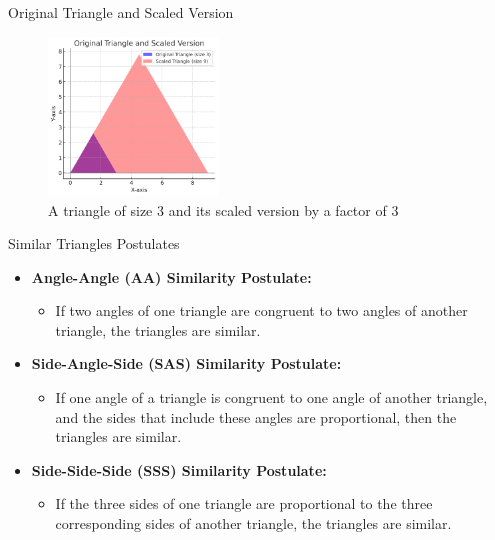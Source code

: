 \documentclass{beamer}
\begin{document}
\begin{frame}{Original Triangle and Scaled Version}
    \begin{figure}
        \centering
        \includegraphics[width=0.4\textwidth]{similar_triangle.png} %
        \caption{A triangle of size 3 and its scaled version by a factor of 3}
    \end{figure}
\end{frame}



\begin{frame}{Similar Triangles Postulates}
    \begin{itemize}
        \item \textbf{Angle-Angle (AA) Similarity Postulate:} 
        \begin{itemize}
            \item If two angles of one triangle are congruent to two angles of another triangle, the triangles are similar.
        \end{itemize}

        \item \textbf{Side-Angle-Side (SAS) Similarity Postulate:} 
        \begin{itemize}
            \item If one angle of a triangle is congruent to one angle of another triangle, and the sides that include these angles are proportional, then the triangles are similar.
        \end{itemize}

        \item \textbf{Side-Side-Side (SSS) Similarity Postulate:} 
        \begin{itemize}
            \item If the three sides of one triangle are proportional to the three corresponding sides of another triangle, the triangles are similar.
        \end{itemize}
    \end{itemize}
    
\end{frame}
\end{document}
